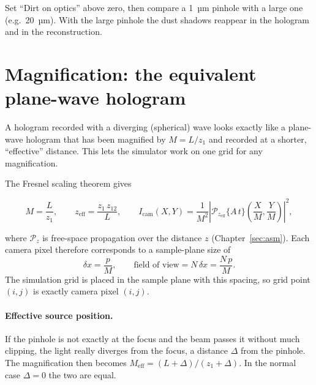 \documentclass[12pt,a4paper]{article}
\newcommand{\Prop}{\mathcal{P}}
\begin{document}
\begin{tool}
Set ``Dirt on optics'' above zero, then compare a 1~µm pinhole with a large one (e.g.\ 20~µm). With the large pinhole the dust shadows reappear in the hologram and in the reconstruction.
\end{tool}

\section{Magnification: the equivalent plane-wave hologram}
\label{sec:scaling}

\begin{short}
A hologram recorded with a diverging (spherical) wave looks exactly like a plane-wave hologram
that has been magnified by $M=L/z_1$ and recorded at a shorter, ``effective'' distance. This lets
the simulator work on one grid for any magnification.
\end{short}

The Fresnel scaling theorem \cite{Paganin} gives
\begin{keyeq}
\begin{equation}
M=\frac{L}{z_1},\qquad
z_\mathrm{eff}=\frac{z_1\,z_{12}}{L},\qquad
I_\mathrm{cam}(X,Y)=\frac{1}{M^2}\left|\Prop_{z_\mathrm{eff}}\{A\,t\}\left(\frac{X}{M},\frac{Y}{M}\right)\right|^{2},
\label{eq:scaling}
\end{equation}
\end{keyeq}
where $\Prop_z$ is free-space propagation over the distance $z$ (Chapter~\ref{sec:asm}). Each camera pixel therefore corresponds to a sample-plane size of
\begin{equation}
\delta x=\frac{p}{M},\qquad \text{field of view}=N\,\delta x=\frac{N\,p}{M}.
\end{equation}
The simulation grid is placed in the sample plane with this spacing, so grid point $(i,j)$ is exactly camera pixel $(i,j)$.

\paragraph{Effective source position.} If the pinhole is not exactly at the focus and the beam passes it without much clipping, the light really diverges from the focus, a distance $\Delta$ from the pinhole. The magnification then becomes $M_\mathrm{eff}=(L+\Delta)/(z_1+\Delta)$. In the normal case $\Delta=0$ the two are equal.

\end{document}
